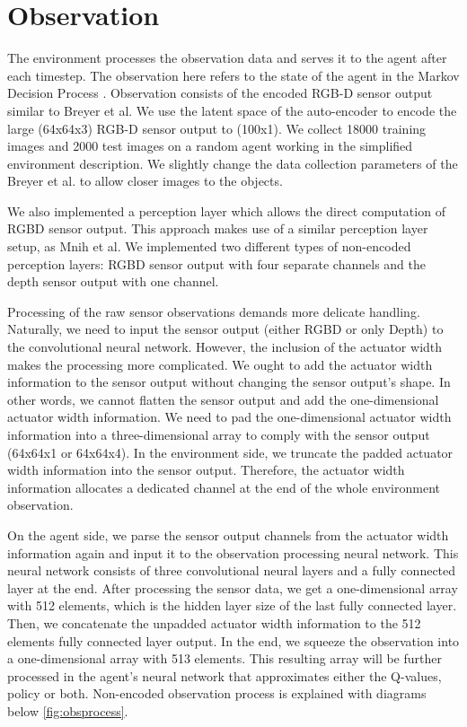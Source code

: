 \section{Observation}

The environment processes the observation data and serves it to the agent after each timestep. The observation here refers to the state of the agent in the Markov Decision Process . Observation consists of the encoded RGB-D sensor output similar to Breyer et al. We use the latent space of the auto-encoder to encode the large (64x64x3) RGB-D sensor output to (100x1). We collect 18000 training images and 2000 test images on a random agent working in the simplified environment description. We slightly change the data collection parameters of the Breyer et al. to allow closer images to the objects.

We also implemented a perception layer which allows the direct computation of RGBD sensor output. This approach makes use of a similar perception layer setup, as Mnih et al. We implemented two different types of non-encoded perception layers: RGBD sensor output with four separate channels and the depth sensor output with one channel. 

Processing of the raw sensor observations demands more delicate handling. Naturally, we need to input the sensor output (either RGBD or only Depth) to the convolutional neural network. However, the inclusion of the actuator width makes the processing more complicated. We ought to add the actuator width information to the sensor output without changing the sensor output's shape. In other words, we cannot flatten the sensor output and add the one-dimensional actuator width information. We need to pad the one-dimensional actuator width information into a three-dimensional array to comply with the sensor output (64x64x1 or 64x64x4). In the environment side, we truncate the padded actuator width information into the sensor output. Therefore, the actuator width information allocates a dedicated channel at the end of the whole environment observation. 

On the agent side, we parse the sensor output channels from the actuator width information again and input it to the observation processing neural network. This neural network consists of three convolutional neural layers and a fully connected layer at the end. After processing the sensor data, we get a one-dimensional array with 512 elements, which is the hidden layer size of the last fully connected layer. Then, we concatenate the unpadded actuator width information to the 512 elements fully connected layer output. In the end, we squeeze the observation into a one-dimensional array with 513 elements. This resulting array will be further processed in the agent's neural network that approximates either the Q-values, policy or both. Non-encoded observation process is explained with diagrams below \ref{fig:obsprocess}.

